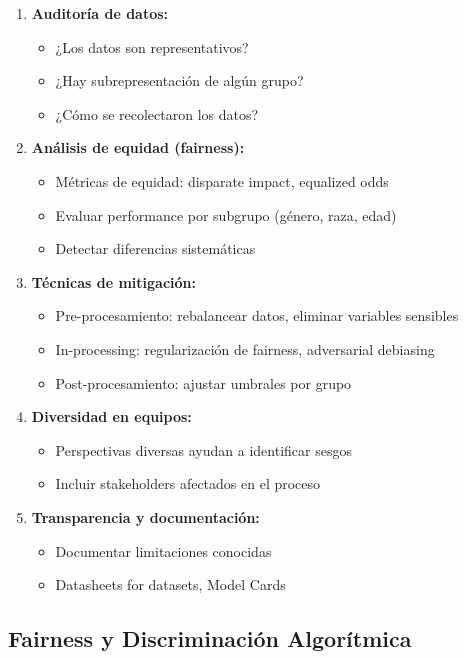 \documentclass[11pt,a4paper]{article}
\begin{document}
\begin{enumerate}
\item \textbf{Auditoría de datos:} 
\begin{itemize}
\item ¿Los datos son representativos?
\item ¿Hay subrepresentación de algún grupo?
\item ¿Cómo se recolectaron los datos?
\end{itemize}

\item \textbf{Análisis de equidad (fairness):}
\begin{itemize}
\item Métricas de equidad: disparate impact, equalized odds
\item Evaluar performance por subgrupo (género, raza, edad)
\item Detectar diferencias sistemáticas
\end{itemize}

\item \textbf{Técnicas de mitigación:}
\begin{itemize}
\item Pre-procesamiento: rebalancear datos, eliminar variables sensibles
\item In-processing: regularización de fairness, adversarial debiasing
\item Post-procesamiento: ajustar umbrales por grupo
\end{itemize}

\item \textbf{Diversidad en equipos:}
\begin{itemize}
\item Perspectivas diversas ayudan a identificar sesgos
\item Incluir stakeholders afectados en el proceso
\end{itemize}

\item \textbf{Transparencia y documentación:}
\begin{itemize}
\item Documentar limitaciones conocidas
\item Datasheets for datasets, Model Cards
\end{itemize}
\end{enumerate}

\subsection{Fairness y Discriminación Algorítmica}
\end{document}
